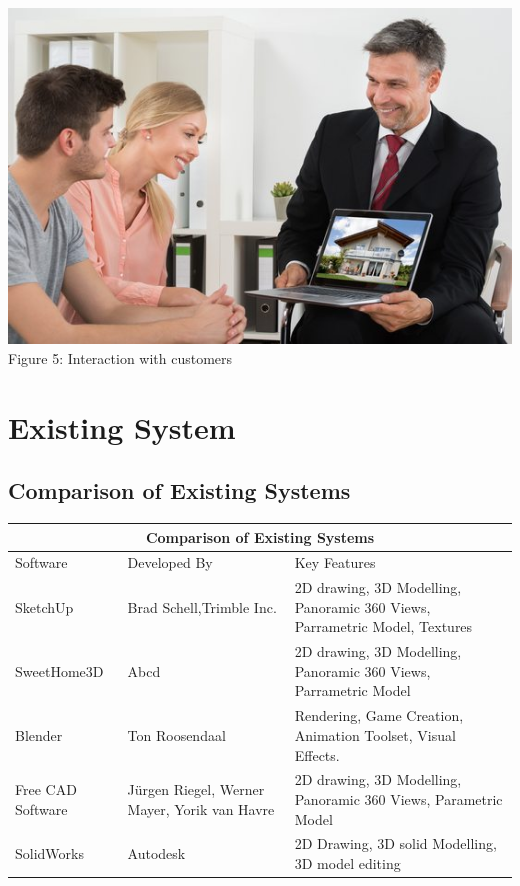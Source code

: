 \documentclass{article}
\begin{document}
\begin{itemize}
\begin{center}
\includegraphics[scale=0.4]{real}
\\Figure 5: Interaction with customers
\end{center}
\end{itemize}
\section{Existing System}
\subsection{Comparison of Existing Systems}



\setlength{\arrayrulewidth}{1mm}
\setlength{\tabcolsep}{9pt}
\renewcommand{\arraystretch}{1.7}

\begin{tabular}{ |p{2cm}|p{4cm}|p{6cm}| }
\hline
\multicolumn{3}{|c|}{Comparison of Existing Systems} \\
\hline
Software&Developed By&Key Features\\
\hline
SketchUp&Brad Schell,Trimble Inc.&2D drawing, 3D Modelling, Panoramic 360 Views, Parrametric Model, Textures\\
\hline
SweetHome3D&Abcd &2D drawing, 3D Modelling, Panoramic 360 Views, Parrametric Model\\
\hline
Blender&Ton Roosendaal&Rendering, Game Creation,
Animation Toolset, Visual Effects.
\\
\hline
Free CAD Software&Jürgen Riegel, Werner Mayer, Yorik van Havre&2D drawing, 3D Modelling, Panoramic 360 Views, Parametric Model\\
\hline
SolidWorks&Autodesk&2D Drawing, 3D solid Modelling, 3D model editing\\
\hline
\end{tabular}
\end{document}
